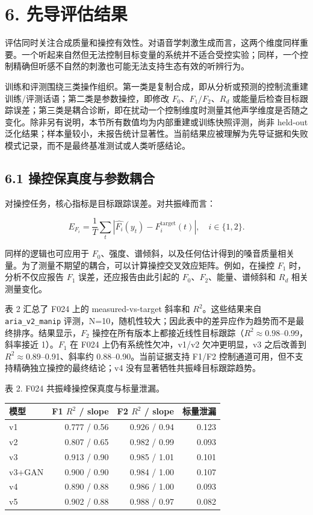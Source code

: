 \section{6. 先导评估结果}\label{ux5148ux5bfcux8bc4ux4f30ux7ed3ux679c}

评估同时关注合成质量和操控有效性。对语音学刺激生成而言，这两个维度同样重要。一个听起来自然但无法控制目标变量的系统并不适合受控实验；同样，一个控制精确但听感不自然的刺激也可能无法支持生态有效的听辨行为。

训练和评测围绕三类操作组织。第一类是复制合成，即从分析或预测的控制流重建训练/评测话语；第二类是参数操控，即修改
\(F_0\)、\(F_1/F_2\)、\(R_d\)
或能量后检查目标跟踪误差；第三类是耦合诊断，即在扰动一个控制维度时测量其他声学维度是否随之变化。除非另有说明，本节所有数值均为内部重建或训练快照评测，尚非
held-out
泛化结果；样本量较小，未报告统计显著性。当前结果应被理解为先导证据和失败模式记录，而不是最终基准测试或人类听感结论。

\subsection{6.1
操控保真度与参数耦合}\label{ux64cdux63a7ux4fddux771fux5ea6ux4e0eux53c2ux6570ux8026ux5408}

对操控任务，核心指标是目标跟踪误差。对共振峰而言：

\[
E_{F_i}
=
\frac{1}{T}
\sum_t
\left|
\widehat{F_i}(y_t)-F_i^{\mathrm{target}}(t)
\right|,
\quad i\in\{1,2\}.
\]

同样的逻辑也可应用于
\(F_0\)、强度、谱倾斜，以及任何估计得到的嗓音质量相关量。为了测量不期望的耦合，可以计算操控交叉效应矩阵。例如，在操控
\(F_1\) 时，分析不仅应报告 \(F_1\) 误差，还应报告由此引起的
\(F_0\)、\(F_2\)、能量、谱倾斜和 \(R_d\) 相关测量变化。

表 2 汇总了 F024 上的 measured-vs-target 斜率和 \(R^2\)。这些结果来自
\texttt{aria\_v2\_manip}
评测，N=10，随机性较大；因此表中的差异应作为趋势而不是最终排序。结果显示，\(F_2\)
操控在所有版本上都接近线性目标跟踪（\(R^2\approx0.98\)--0.99，斜率接近
1）。\(F_1\) 在 F024 上仍有系统性欠冲，v1/v2 欠冲更明显，v3 之后改善到
\(R^2\approx0.89\)--0.91、斜率约 0.88--0.90。当前证据支持 F1/F2
控制通道可用，但不支持精确独立操控的最终结论；v4
没有显著牺牲共振峰目标跟踪趋势。

表 2. F024 共振峰操控保真度与标量泄漏。

{\def\LTcaptype{none} %
\begin{longtable}[]{@{}lrrr@{}}
\toprule\noalign{}
模型 & F1 \(R^2\) / slope & F2 \(R^2\) / slope & 标量泄漏 \\
\midrule\noalign{}
\endhead
\bottomrule\noalign{}
\endlastfoot
v1 & 0.777 / 0.56 & 0.926 / 0.94 & 0.123 \\
v2 & 0.807 / 0.65 & 0.982 / 0.99 & 0.093 \\
v3 & 0.913 / 0.90 & 0.985 / 1.01 & 0.101 \\
v3+GAN & 0.900 / 0.90 & 0.984 / 1.00 & 0.107 \\
v4 & 0.890 / 0.88 & 0.986 / 1.00 & 0.093 \\
v5 & 0.902 / 0.88 & 0.988 / 0.97 & 0.082 \\
\end{longtable}
}

